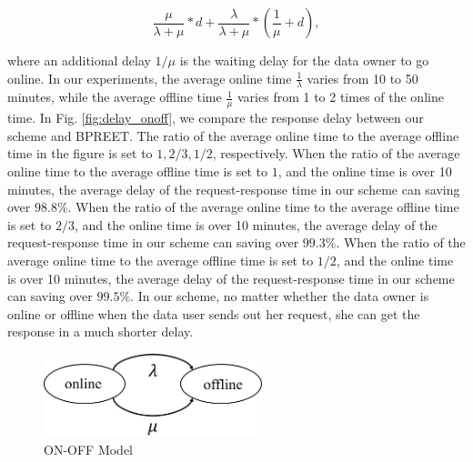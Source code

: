 \documentclass[journal]{IEEEtran}
\begin{document}
    \begin{equation}
        \frac{\mu}{\lambda+\mu}*d + \frac{\lambda}{\lambda+\mu}*(\frac{1}{\mu}+d),
    \end{equation}

    where an additional delay $1/\mu$ is the waiting delay for the data owner to go online. In our experiments, the average online time $\frac{1}{\lambda}$ varies from 10 to 50 minutes, while the average offline time $\frac{1}{\mu}$ varies from 1 to 2 times of the online time. In Fig. \ref{fig:delay_onoff}, we compare the response delay between our scheme and BPREET. The ratio of the average online time to the average offline time in the figure is set to $1, 2/3, 1/2$, respectively. When the ratio of the average online time to the average offline time is set to $1$, and the online time is over 10 minutes, the average delay of the request-response time in our scheme can saving over $98.8\%$. When the ratio of the average online time to the average offline time is set to $2/3$, and the online time is over 10 minutes, the average delay of the request-response time in our scheme can saving over $99.3\%$. When the ratio of the average online time to the average offline time is set to $1/2$, and the online time is over 10 minutes, the average delay of the request-response time in our scheme can saving over $99.5\%$. In our scheme, no matter whether the data owner is online or offline when the data user sends out her request, she can get the response in a much shorter delay.

\begin{figure}[h]
    \centering
    \includegraphics[width=180pt]{picture/onoff3.png}
    \caption{ON-OFF Model}
    \label{fig:onoff}
\end{figure}
\end{document}
